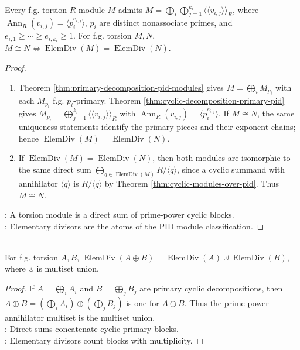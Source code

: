 \begin{theorem} \label{thm:primary-cyclic-decomposition-pid} \\
Every f.g. torsion $R$-module $M$ admits $M=\bigoplus\limits_i\bigoplus\limits_{j=1}^{k_i}\langle\!\langle v_{i,j}\rangle\!\rangle_R$, where $\operatorname{Ann}_R(v_{i,j})=\langle p_i^{e_{i,j}}\rangle$, $p_i$ are distinct nonassociate primes, and $e_{i,1}\geq\cdots\geq e_{i,k_i}\geq1$. For f.g. torsion $M,N$, $M\cong N\iff\operatorname{ElemDiv}(M)=\operatorname{ElemDiv}(N)$.
\begin{proof}
\begin{enumerate}[label=\roman*.]
\setlength{\itemsep}{0pt}
\item[$(\Rightarrow)$] Theorem \ref{thm:primary-decomposition-pid-modules} gives $M=\bigoplus\limits_iM_{p_i}$ with each $M_{p_i}$ f.g. $p_i$-primary. Theorem \ref{thm:cyclic-decomposition-primary-pid} gives $M_{p_i}=\bigoplus\limits_{j=1}^{k_i}\langle\!\langle v_{i,j}\rangle\!\rangle_R$ with $\operatorname{Ann}_R(v_{i,j})=\langle p_i^{e_{i,j}}\rangle$. If $M\cong N$, the same uniqueness statements identify the primary pieces and their exponent chains; hence $\operatorname{ElemDiv}(M)=\operatorname{ElemDiv}(N)$.
\item[$(\Leftarrow)$] If $\operatorname{ElemDiv}(M)=\operatorname{ElemDiv}(N)$, then both modules are isomorphic to the same direct sum $\bigoplus\limits_{q\in\operatorname{ElemDiv}(M)}R/\langle q\rangle$, since a cyclic summand with annihilator $\langle q\rangle$ is $R/\langle q\rangle$ by Theorem
\ref{thm:cyclic-modules-over-pid}. Thus $M\cong N$.
\end{enumerate}
\noindent
{}: A torsion module is a direct sum of prime-power cyclic blocks.\\
: Elementary divisors are the atoms of the PID module classification.
\end{proof}
\end{theorem}

\begin{proposition} \label{prop:elementary-divisors-direct-sums} \\
For f.g. torsion $A,B$, $\operatorname{ElemDiv}(A\oplus B)= \operatorname{ElemDiv}(A)\uplus\operatorname{ElemDiv}(B)$, where $\uplus$ is multiset union.
\begin{proof}
If $A=\bigoplus_i A_i$ and $B=\bigoplus_jB_j$ are primary cyclic decompositions, then $A\oplus B=(\bigoplus_i A_i)\oplus(\bigoplus_jB_j)$ is one for $A\oplus B$. Thus the prime-power annihilator multiset is the multiset union.\\
: Direct sums concatenate cyclic primary blocks.\\
: Elementary divisors count blocks with multiplicity.
\end{proof}
\end{proposition}

